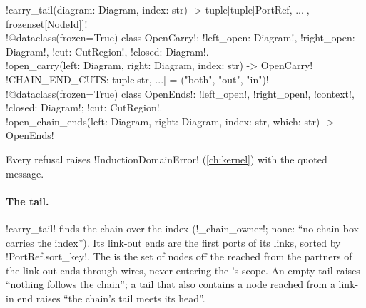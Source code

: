 \begin{signature}
\py!carry_tail(diagram: Diagram, index: str) -> tuple[tuple[PortRef, ...], frozenset[NodeId]]!\\
\py!@dataclass(frozen=True) class OpenCarry!: \py!left_open: Diagram!, \py!right_open: Diagram!, \py!cut: CutRegion!, \py!closed: Diagram!.\\
\py!open_carry(left: Diagram, right: Diagram, index: str) -> OpenCarry!\\
\py!CHAIN_END_CUTS: tuple[str, ...] = ("both", "out", "in")!\\
\py!@dataclass(frozen=True) class OpenEnds!: \py!left_open!, \py!right_open!, \py!context!, \py!closed: Diagram!; \py!cut: CutRegion!.\\
\py!open_chain_ends(left: Diagram, right: Diagram, index: str, which: str) -> OpenEnds!
\end{signature}
\noindent Every refusal raises \py!InductionDomainError! (\cref{ch:kernel}) with the quoted message.

\paragraph{The tail.} \py!carry_tail! finds the chain \bbox{} over the index (\py!_chain_owner!; none: ``no chain box carries the index''). Its link-out ends are the first ports of its links, sorted by \py!PortRef.sort_key!. The  is the set of nodes off the \bbox{} reached from the partners of the link-out ends through wires, never entering the \bbox{}'s scope. An empty tail raises ``nothing follows the chain''; a tail that also contains a node reached from a link-in end raises ``the chain's tail meets its head''.

